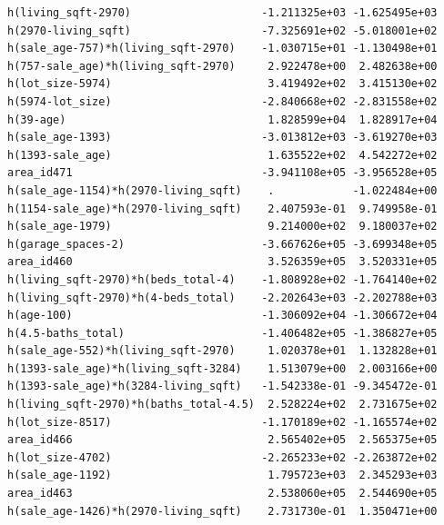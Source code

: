 \documentclass[
]{article}
\begin{document}
\begin{verbatim}
h(living_sqft-2970)                    -1.211325e+03 -1.625495e+03
h(2970-living_sqft)                    -7.325691e+02 -5.018001e+02
h(sale_age-757)*h(living_sqft-2970)    -1.030715e+01 -1.130498e+01
h(757-sale_age)*h(living_sqft-2970)     2.922478e+00  2.482638e+00
h(lot_size-5974)                        3.419492e+02  3.415130e+02
h(5974-lot_size)                       -2.840668e+02 -2.831558e+02
h(39-age)                               1.828599e+04  1.828917e+04
h(sale_age-1393)                       -3.013812e+03 -3.619270e+03
h(1393-sale_age)                        1.635522e+02  4.542272e+02
area_id471                             -3.941108e+05 -3.956528e+05
h(sale_age-1154)*h(2970-living_sqft)    .            -1.022484e+00
h(1154-sale_age)*h(2970-living_sqft)    2.407593e-01  9.749958e-01
h(sale_age-1979)                        9.214000e+02  9.180037e+02
h(garage_spaces-2)                     -3.667626e+05 -3.699348e+05
area_id460                              3.526359e+05  3.520331e+05
h(living_sqft-2970)*h(beds_total-4)    -1.808928e+02 -1.764140e+02
h(living_sqft-2970)*h(4-beds_total)    -2.202643e+03 -2.202788e+03
h(age-100)                             -1.306092e+04 -1.306672e+04
h(4.5-baths_total)                     -1.406482e+05 -1.386827e+05
h(sale_age-552)*h(living_sqft-2970)     1.020378e+01  1.132828e+01
h(1393-sale_age)*h(living_sqft-3284)    1.513079e+00  2.003166e+00
h(1393-sale_age)*h(3284-living_sqft)   -1.542338e-01 -9.345472e-01
h(living_sqft-2970)*h(baths_total-4.5)  2.528224e+02  2.731675e+02
h(lot_size-8517)                       -1.170189e+02 -1.165574e+02
area_id466                              2.565402e+05  2.565375e+05
h(lot_size-4702)                       -2.265233e+02 -2.263872e+02
h(sale_age-1192)                        1.795723e+03  2.345293e+03
area_id463                              2.538060e+05  2.544690e+05
h(sale_age-1426)*h(2970-living_sqft)    2.731730e-01  1.350471e+00
                                                                  

\end{verbatim}
\end{document}
